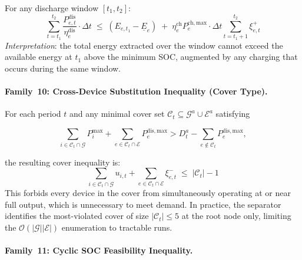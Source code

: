 For any discharge window $[t_1, t_2]$:
\begin{equation}\label{eq:cut-energy-duration}
  \boxed{
    \sum_{t=t_1}^{t_2} \frac{P^{\mathrm{dis}}_{e,t}}{\eta^{\mathrm{dis}}_e} \cdot \Delta t
    \;\leq\;
    (E_{e,t_1} - \underline{E}_e)
    \;+\;
    \eta^{\mathrm{ch}}_e P^{\mathrm{ch,max}}_e \cdot \Delta t
    \sum_{t=t_1+1}^{t_2} \xi^{+}_{e,t}
  }
\end{equation}
\textit{Interpretation}: the total energy extracted over the window cannot
exceed the available energy at $t_1$ above the minimum SOC, augmented by
any charging that occurs during the same window.

\paragraph{Family~10: Cross-Device Substitution Inequality (Cover Type).}

For each period $t$ and any minimal cover set
$\mathcal{C}_t \subseteq \mathcal{G}^{a} \cup \mathcal{E}^{a}$ satisfying

$$
  \sum_{i \in \mathcal{C}_t \cap \mathcal{G}} P^{\max}_i
  + \sum_{e \in \mathcal{C}_t \cap \mathcal{E}} P^{\mathrm{dis,max}}_e
  > D^a_t - \sum_{e \notin \mathcal{C}_t} P^{\mathrm{dis,max}}_e,
$$

the resulting cover inequality is:
\begin{equation}\label{eq:cut-cover}
  \sum_{i \in \mathcal{C}_t \cap \mathcal{G}} u_{i,t}
  + \sum_{e \in \mathcal{C}_t \cap \mathcal{E}} \xi^{-}_{e,t}
  \;\leq\; |\mathcal{C}_t| - 1
\end{equation}
This forbids every device in the cover from simultaneously operating at or
near full output, which is unnecessary to meet demand.  In practice, the
separator identifies the most-violated cover of size $|\mathcal{C}_t| \leq 5$
at the root node only, limiting the $\mathcal{O}(|\mathcal{G}||\mathcal{E}|)$
enumeration to tractable runs.

\paragraph{Family~11: Cyclic SOC Feasibility Inequality.}


